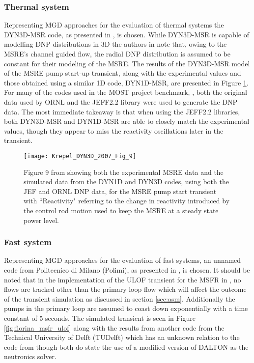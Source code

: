 \documentclass[review]{elsarticle}
\begin{document}
\subsubsection{Thermal system} \label{sssec:mgd_ts}
Representing MGD approaches for the evaluation of thermal systems the DYN3D-MSR
code, as presented in \cite{krepel_dyn3d-msr_2007}, is chosen. While DYN3D-MSR is
capable of modelling DNP distributions in 3D the authors in
\cite{krepel_dyn3d-msr_2007} note that, owing to the MSRE's channel guided flow,
the radial DNP distribution is assumed to be constant for their modeling of the MSRE.
The results of the DYN3D-MSR model of the MSRE pump start-up transient,
along with the experimental values and those obtained using a similar 1D code,
DYN1D-MSR, are presented in Figure \ref{fig:krepel_dyn3d_msre_pump_start}.
For many of the codes used in the
MOST project benchmark, \cite{delpech_benchmark_2003}, both the original data used
by ORNL and the JEFF2.2 library were used to generate the DNP data. The most
immediate takeaway is that when using the JEFF2.2 libraries, both DYN3D-MSR and
DYN1D-MSR are able to closely match the experimental values, though they appear to
miss the reactivity oscillations later in the transient.

\begin{figure}[H]
   \centering
   \texttt{[image: Krepel\_DYN3D\_2007\_Fig\_9]}
   \caption{Figure 9 from \cite{krepel_dyn3d-msr_2007} showing both the experimental MSRE data
   and the simulated data from the DYN1D and DYN3D codes, using both the JEF and ORNL DNP data, for
   the MSRE pump start transient with ``Reactivity" referring to the change in reactivity introduced
   by the control rod motion used to keep the MSRE at a steady state power level.} 
   \label{fig:krepel_dyn3d_msre_pump_start}
\end{figure}

\subsubsection{Fast system} \label{sssec:mgd_fs}
Representing MGD approaches for the evaluation of fast systems, an unnamed code
from Politecnico di Milano (Polimi), as presented in \cite{fiorina_modelling_2014}, is
chosen. It should be noted that in the implementation of the ULOF transient for
the MSFR in \cite{fiorina_modelling_2014}, no flows are tracked other than the primary
loop flow which will affect the outcome of the transient simulation as discussed in
section \ref{sec:asm}. Additionally the pumps in the primary loop are assumed to
coast down exponentially with a time constant of 5 seconds. The simulated transient is
seen in Figure \ref{fig:fiorina_msfr_ulof} along with the results from another
code from the Technical University of Delft (TUDelft) which has an unknown relation to
the code from \cite{kophazi_development_2009} though both do state the use of a
modified version of DALTON as the neutronics solver. 
\end{document}
